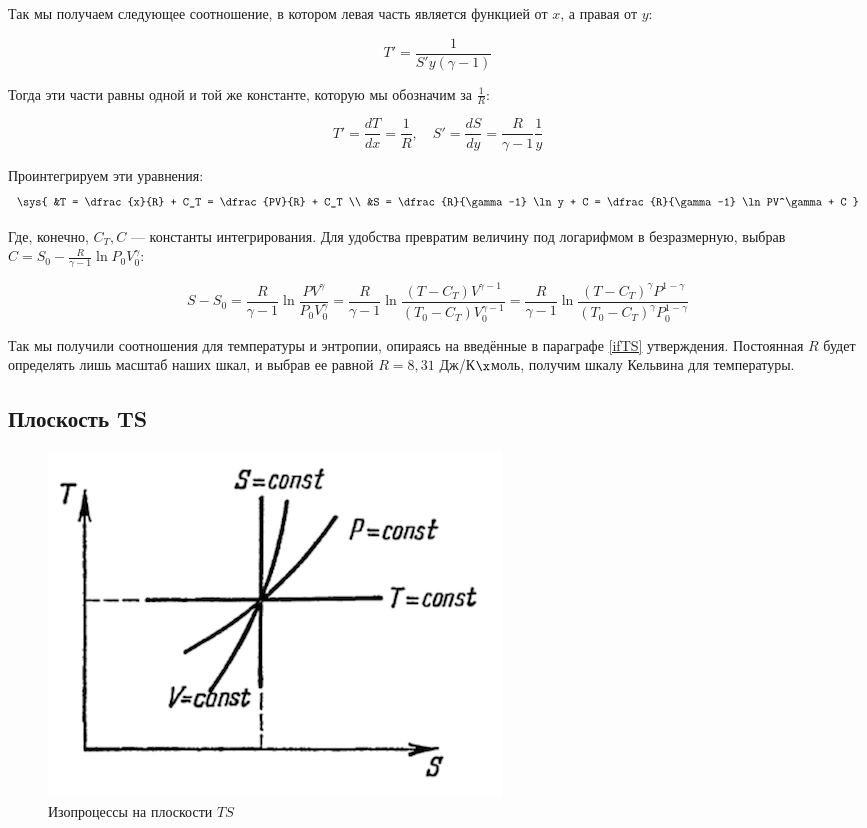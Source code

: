 \documentclass[12pt]{kiarticle}
\begin{document}
Так мы получаем следующее соотношение, в котором левая часть является функцией от $ x $, а правая от $ y $:

\begin{equation}\label{T'S'}
T' = \dfrac{1}{S'y(\gamma - 1)}
\end{equation}

Тогда эти части равны одной и той же константе, которую мы обозначим за $ \frac{1}{R} $:

\begin{equation}\label{R}
T' = \dfrac{dT}{dx} = \dfrac{1}{R}, \quad S' = \dfrac{dS}{dy} = \dfrac{R}{\gamma - 1} \dfrac{1}{y}
\end{equation}

Проинтегрируем эти уравнения:
\begin{equation}\label{TS}
\sys{
&T = \dfrac{x}{R} + C_T = \dfrac{PV}{R}  + C_T \\
&S = \dfrac{R}{\gamma -1} \ln y + C =  \dfrac{R}{\gamma -1} \ln PV^\gamma + C
}
\end{equation} 

Где, конечно, $ C_T, C $ --- константы интегрирования. Для удобства превратим величину под логарифмом в безразмерную, выбрав $ C = S_0 - \frac{R}{\gamma -1} \ln P_0V^\gamma_0$:

\begin{equation}\label{S}
S - S_0 = \dfrac{R}{\gamma -1} \ln  \dfrac{PV^\gamma}{P_0V_0^\gamma} = \dfrac{R}{\gamma -1} \ln \dfrac{(T - C_T) V^{\gamma - 1}}{(T_0 - C_T) V^{\gamma -1 }_0} = \dfrac{R}{\gamma -1} \ln \frac{(T - C_T)^\gamma P^{1 - \gamma}}{(T_0 - C_T)^\gamma P_0^{1 -\gamma}}
\end{equation}

Так мы получили соотношения для температуры и энтропии, опираясь на введённые в параграфе \ref{ifTS} утверждения. Постоянная $ R $ будет определять лишь масштаб наших шкал, и выбрав ее равной $ R = 8,31 $ Дж/К$ \x $моль, получим шкалу Кельвина для температуры. 

\subsection{Плоскость TS}

\begin{figure} 
	\includegraphics{TS}
	\caption{Изопроцессы на плоскости $ TS $}
	\label{GrafTS}
\end{figure}
\end{document}
